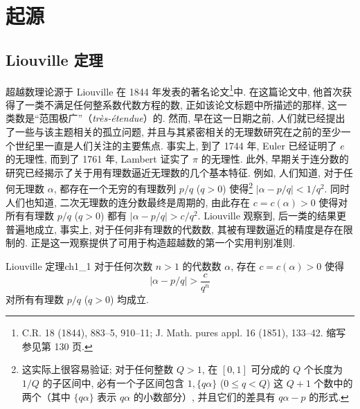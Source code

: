 
\chapter{起源}\label{ch:1}

\section{Liouville 定理}

超越数理论源于 Liouville 在 1844 年发表的著名论文\footnote{C.R. 18 (1844), 883--5, 910--11; J. Math. pures appl. 16 (1851), 133--42. 缩写参见第 130 页.}中. 在这篇论文中, 他首次获得了一类不满足任何整系数代数方程的数, 正如该论文标题中所描述的那样, 这一类数是“范围极广”（\textit{tr\`es-\'etendue}）的. 然而, 早在这一日期之前, 人们就已经提出了一些与该主题相关的孤立问题, 并且与其紧密相关的无理数研究在之前的至少一个世纪里一直是人们关注的主要焦点. 事实上, 到了 1744 年, Euler 已经证明了 $e$ 的无理性, 而到了 1761 年, Lambert 证实了 $\pi$ 的无理性. 此外, 早期关于连分数的研究已经揭示了关于用有理数逼近无理数的几个基本特征. 例如, 人们知道, 对于任何无理数 $\alpha$, 都存在一个无穷的有理数列 $p/q$ ($q>0$) 使得\footnote{这实际上很容易验证; 对于任何整数 $Q > 1$, 在 $[0, 1]$ 可分成的 $Q$ 个长度为 $1/Q$ 的子区间中, 必有一个子区间包含 $1, \{q\alpha\}$ ($0 \le q < Q$) 这 $Q+1$ 个数中的两个（其中 $\{q\alpha\}$ 表示 $q\alpha$ 的小数部分）, 并且它们的差具有 $q\alpha - p$ 的形式.} $|\alpha-p/q|<1/q^2$. 同时人们也知道, 二次无理数的连分数最终是周期的, 由此存在 $c = c(\alpha) > 0$ 使得对所有有理数 $p/q$ ($q > 0$) 都有 $|\alpha - p/q| > c/q^2$. Liouville 观察到, 后一类的结果更普遍地成立, 事实上, 对于任何非有理数的代数数, 其被有理数逼近的精度是存在限制的. 正是这一观察提供了可用于构造超越数的第一个实用判别准则.

\begin{mythm}{Liouville 定理}{ch1_1}
对于任何次数 $n > 1$ 的代数数 $\alpha$, 存在 $c = c(\alpha) > 0$ 使得
\[
|\alpha - p/q| > \frac{c}{q^n}
\]
对所有有理数 $p/q$ ($q > 0$) 均成立.
\end{mythm}


